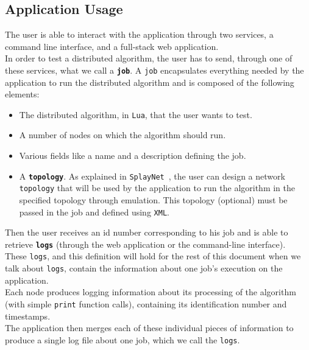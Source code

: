 \documentclass{eplmastersthesis}
\begin{document}
      \subsection{Application Usage}

        The user is able to interact with the application through two
        services, a command line interface, and a full-stack web application.\\
        In order to test a distributed algorithm, the user has to send, through
        one of these services, what we call a \textbf{\texttt{job}}. A
        \texttt{job} encapsulates everything needed by the application
        to run the distributed algorithm and is composed of the following
        elements:

        \begin{itemize}
          \item The distributed algorithm, in \texttt{Lua}, that the user wants to test.
          \item A number of nodes on which the algorithm should run.
          \item Various fields like a name and a description defining the job.
          \item A \textbf{\texttt{topology}}. As explained in
          \texttt{SplayNet}~\cite{SplayNet}, the user can design a network
          \texttt{topology} that will be used by the application
          to run the algorithm in the specified topology through emulation.
          This topology (optional) must be passed in the job and defined
          using \texttt{XML}.
        \end{itemize}

        Then the user receives an id number corresponding to his job and
        is able to retrieve \textbf{\texttt{logs}} (through the web application
        or the command-line interface).\\
        These \texttt{logs}, and this
        definition will hold for the rest of this document when we talk about
        \texttt{logs}, contain the information about one job's
        execution on the application.\\
        Each node produces logging information about its processing of the
        algorithm (with simple \texttt{print} function calls), containing its
        identification number and timestamps.\\
        The application then merges each of these individual pieces of information
        to produce a single log file about one job, which we
        call the \texttt{logs}.
\end{document}
